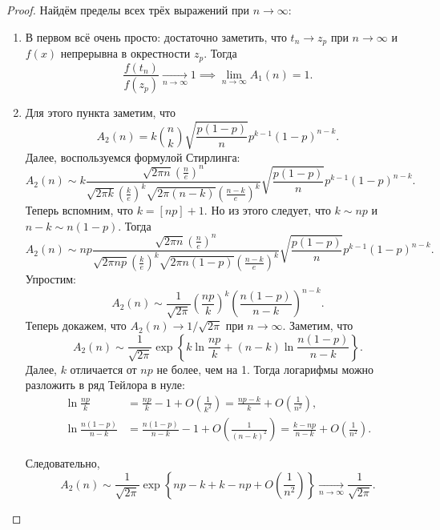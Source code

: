 \begin{proof}
	Найдём пределы всех трёх выражений при $n \to \infty$:
	\begin{enumerate}
		\item В первом всё очень просто: достаточно заметить, что $t_{n} \to z_{p}$ при $n \to \infty$ и $f(x)$ непрерывна в окрестности $z_{p}$.
		Тогда
		\[
			\frac{f(t_{n})}{f(z_{p})} \xrightarrow[n \to \infty]{} 1 \implies \lim_{n \to \infty} A_{1}(n) = 1.
		\]
		
		\item Для этого пункта заметим, что
		\[
			A_{2}(n) = k\binom{n}{k}\sqrt{\frac{p(1 - p)}{n}}p^{k - 1}(1 - p)^{n - k}.
		\]
		Далее, воспользуемся формулой Стирлинга:
		\[
			A_{2}(n) \sim k\frac{\sqrt{2\pi n}(\frac{n}{e})^{n}}{\sqrt{2\pi k}(\frac{k}{e})^{k}\sqrt{2\pi(n - k)}(\frac{n - k}{e})^{k}}\sqrt{\frac{p(1 - p)}{n}}p^{k - 1}(1 - p)^{n - k}.
		\]
		Теперь вспомним, что $k = [np] + 1$.
		Но из этого следует, что $k \sim np$ и $n - k \sim n(1 - p)$.
		Тогда
		\[
			A_{2}(n) \sim np\frac{\sqrt{2\pi n}(\frac{n}{e})^{n}}{\sqrt{2\pi np}(\frac{k}{e})^{k}\sqrt{2\pi n(1 - p)}(\frac{n - k}{e})^{k}}\sqrt{\frac{p(1 - p)}{n}}p^{k - 1}(1 - p)^{n - k}.
		\]
		Упростим:
		\[
			A_{2}(n) \sim \frac{1}{\sqrt{2\pi}}\left(\frac{np}{k}\right)^{k}\left(\frac{n(1 - p)}{n - k}\right)^{n - k}.
		\]
		Теперь докажем, что $A_{2}(n) \to 1/\sqrt{2\pi}$ при $n \to \infty$.
		Заметим, что
		\[
			A_{2}(n) \sim \frac{1}{\sqrt{2\pi}}\exp\left\{k\ln\frac{np}{k} + (n - k)\ln\frac{n(1 - p)}{n - k}\right\}.
		\]
		Далее, $k$ отличается от $np$ не более, чем на 1.
		Тогда логарифмы можно разложить в ряд Тейлора в нуле:
		\begin{align*}
			\ln \frac{np}{k} 
			&= \frac{np}{k} - 1 + O\left(\frac{1}{k^{2}}\right) 
			= \frac{np - k}{k} + O\left(\frac{1}{n^{2}}\right), \\
			\ln \frac{n(1 - p)}{n - k} &= \frac{n(1 - p)}{n - k} - 1 + O\left(\frac{1}{(n - k)^{2}}\right) = \frac{k - np}{n - k} + O\left(\frac{1}{n^{2}}\right).
		\end{align*}
		
		Следовательно,
		\[
			A_{2}(n) \sim \frac{1}{\sqrt{2\pi}}\exp\left\{np - k + k - np + O\left(\frac{1}{n^{2}}\right)\right\} \xrightarrow[n \to \infty]{} \frac{1}{\sqrt{2\pi}}.
		\]
		

\end{enumerate}
\end{proof}
